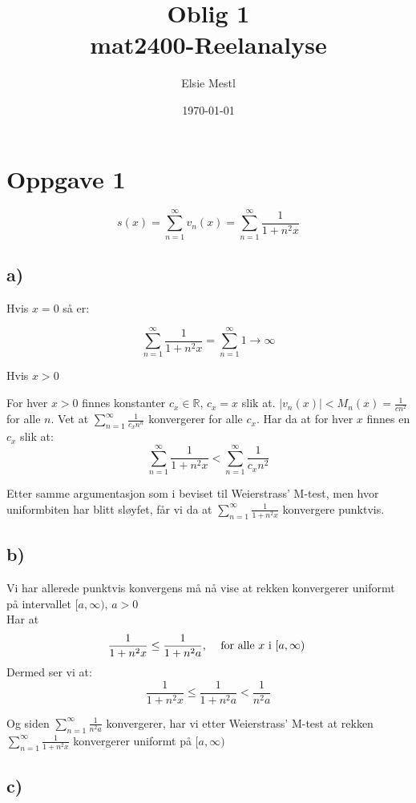 \documentclass{article}
\author{Elsie Mestl}
\date{\today}
\title{Oblig 1 \\ mat2400-Reelanalyse}
\begin{document}
\maketitle


\section*{Oppgave 1}

\[s(x) = \sum\limits_{n= 1}^\infty v_n(x) = \sum\limits_{n= 1}^\infty \frac{1}{1+n^2x} \]

\subsection*{a)}

Hvis $x = 0$ så er:

\[\sum\limits_{n= 1}^\infty \frac{1}{1+n^2x} = \sum\limits_{n= 1}^\infty 1 \rightarrow \infty\]


Hvis $x > 0$

For hver $x > 0$ finnes konstanter $c_x \in \mathbb{R}$, $c_x = x$ slik at. $|v_n(x)| < M_n(x) = \frac{1}{cn^2}$ for alle $n$. Vet at $\sum\limits_{n = 1}^\infty \frac{1}{c_xn^n}$ konvergerer for alle $c_x$. Har da at for hver $x$ finnes en $c_x$ slik at: \[\sum\limits_{n= 1}^\infty \frac{1}{1 + n^2x } < \sum\limits_{n=1}^\infty \frac{1}{c_xn^2}\]

Etter samme argumentasjon som i beviset til Weierstrass' M-test, men hvor uniformbiten har blitt sløyfet, får vi da at $\sum \limits_{n= 1}^\infty \frac{1}{1 + n^2x}$ konvergere punktvis.



\subsection*{b)}
Vi har allerede punktvis konvergens må nå vise at rekken konvergerer uniformt på intervallet $[a, \infty), \, a > 0$ \\
  Har at \[\frac{1}{1 + n^2x}  \leq \frac{1}{1 + n^2a} \text{, \quad for alle $x$ i $[a, \infty)$ }\]
    Dermed ser vi at:
    \[ \frac{1}{1 + n^2x}  \leq \frac{1}{1 + n^2a} < \frac{1}{n^2a}\]

    Og siden $\sum \limits_{n= 1}^\infty \frac{1}{n^2a}$ konvergerer, har vi etter Weierstrass' M-test at rekken $\sum \limits_{n= 1}^\infty \frac{1}{1 + n^2x}$ konvergerer uniformt på $[a, \infty)$




      \subsection*{c)}
\end{document}
